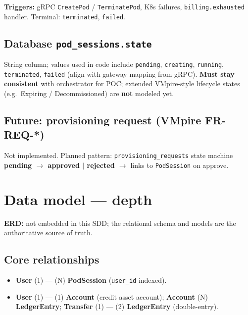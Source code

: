 \documentclass[12pt,a4paper]{article}
\begin{document}
\vspace{0.5em}
\noindent\textbf{Triggers:} gRPC \texttt{CreatePod} / \texttt{TerminatePod}, K8s failures, \texttt{billing.exhausted} handler. Terminal: \texttt{terminated}, \texttt{failed}.

\subsection{Database \texttt{pod\_sessions.state}}
String column; values used in code include \texttt{pending}, \texttt{creating}, \texttt{running}, \texttt{terminated}, \texttt{failed} (align with gateway mapping from gRPC). \textbf{Must stay consistent} with orchestrator for POC; extended VMpire-style lifecycle states (e.g.\ Expiring / Decommissioned) are \textbf{not} modeled yet.

\subsection{Future: provisioning request (VMpire FR-REQ-*)}
Not implemented. Planned pattern: \texttt{provisioning\_requests} state machine \textbf{pending $\rightarrow$ approved $\mid$ rejected $\rightarrow$} links to \texttt{PodSession} on approve.

\section{Data model --- depth}
\label{app:data-depth}

\textbf{ERD:} not embedded in this SDD; the relational schema and models are the authoritative source of truth.

\subsection{Core relationships}
\begin{itemize}[leftmargin=*]
  \item \textbf{User} (1) --- (N) \textbf{PodSession} (\texttt{user\_id} indexed).
  \item \textbf{User} (1) --- (1) \textbf{Account} (credit asset account); \textbf{Account} (N) \textbf{LedgerEntry}; \textbf{Transfer} (1) --- (2) \textbf{LedgerEntry} (double-entry).
\end{itemize}
\end{document}
